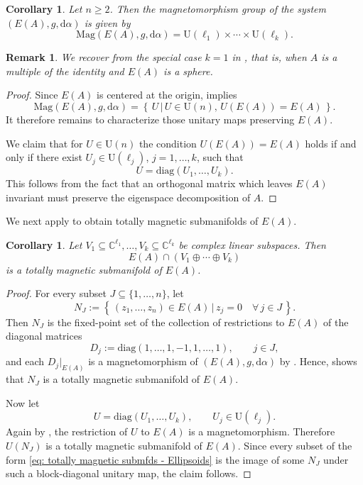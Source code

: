 \documentclass[11pt,reqno]{amsart}
\newcommand{\IC}{{\mathbb C}}%
\theoremstyle{plain}
\newtheorem{cor}[thm]{Corollary}
\newtheorem{rem}[thm]{Remark}
\theoremstyle{definition}
\numberwithin{equation}{section}
\def\d{\delta}
\def\d{\delta}
\def\d{{\mathrm{d}}}
\newcommand{\set}[2]{\left\{ \, #1  \, | \,  #2 \, \right\}}
\begin{document}
\begin{cor}
\label{cor: magnetomorphism group - Ellipsoids}
Let $n\geq 2$. Then the magnetomorphism group of the system $(E(A),g,\d\alpha)$ is given by
\[
\mathrm{Mag}(E(A),g,\d\alpha)
=
\mathrm{U}(\ell_1)\times\cdots\times \mathrm{U}(\ell_k).
\]
\end{cor}
\begin{rem}
\label{rem: magnetomorphisms sphere}
We recover \cite[Cor.~1.5]{ABM} from the special case $k=1$ in , that is, when $A$ is a multiple of the identity and $E(A)$ is a sphere.
\end{rem}
\begin{proof}
Since $E(A)$ is centered at the origin,  implies
\[
\mathrm{Mag}(E(A),g,\d\alpha)
=
\set{U}{U \in \mathrm{U}(n),\, U(E(A)) = E(A)}.
\]
It therefore remains to characterize those unitary maps preserving $E(A)$.

We claim that for $U \in \mathrm{U}(n)$ the condition $U(E(A)) = E(A)$ holds if and only if there exist $U_j \in \mathrm{U}(\ell_j)$, $j=1,\ldots,k$, such that
\[
U=\mathrm{diag}(U_1,\ldots,U_k).
\]
This follows from the fact that an orthogonal matrix which leaves $E(A)$ invariant must preserve the eigenspace decomposition of $A$.
\end{proof}

We next apply  to obtain totally magnetic submanifolds of $E(A)$.

\begin{cor}
\label{cor: totally magnetic submfds - Ellipsoids}
Let $V_1 \subseteq \IC^{\ell_1}, \ldots, V_k \subseteq \IC^{\ell_k}$ be complex linear subspaces. Then
\begin{equation}
\label{eq: totally magnetic submfds - Ellipsoids}
E(A)\cap (V_1\oplus\cdots\oplus V_k)
\end{equation}
is a totally magnetic submanifold of $E(A)$.
\end{cor}
\begin{proof}
For every subset $J \subseteq \{1,\ldots,n\}$, let
\[
N_J := \set{(z_1,\ldots,z_n) \in E(A)}{z_j = 0 \quad \forall\, j \in J}.
\]
Then $N_J$ is the fixed-point set of the collection of restrictions to $E(A)$ of the diagonal matrices
\[
D_j:=\mathrm{diag}(1,\ldots,1,-1,1,\ldots,1), \qquad j\in J,
\]
and each $D_j|_{E(A)}$ is a magnetomorphism of $(E(A),g,\d\alpha)$ by . Hence,  shows that $N_J$ is a totally magnetic submanifold of $E(A)$.

Now let
\[
U=\mathrm{diag}(U_1,\ldots,U_k),
\qquad
U_j\in\mathrm{U}(\ell_j).
\]
Again by , the restriction of $U$ to $E(A)$ is a magnetomorphism. Therefore $U(N_J)$ is a totally magnetic submanifold of $E(A)$. Since every subset of the form \eqref{eq: totally magnetic submfds - Ellipsoids} is the image of some $N_J$ under such a block-diagonal unitary map, the claim follows.
\end{proof}
\end{document}
